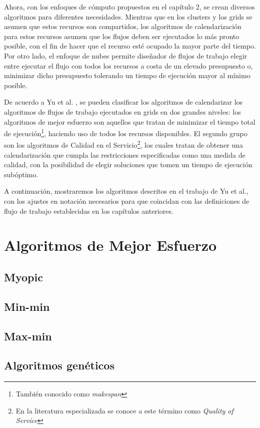 \documentclass[letterpaper, 12pt]{report}
\begin{document}
Ahora, con los enfoques de cómputo propuestos en el capítulo 2, se crean diversos algoritmos para diferentes necesidades. Mientras que en los clusters y los grids se asumen que estos recursos son compartidos, los algoritmos de calendarización para estos recursos asumen que los flujos deben ser ejecutados lo más pronto posible, con el fin de hacer que el recurso esté ocupado la mayor parte del tiempo. Por otro lado, el enfoque de nubes permite diseñador de flujos de trabajo elegir entre ejecutar el flujo con todos los recursos a costa de un elevado presupuesto o, minimizar dicho presupuesto tolerando un tiempo de ejecución mayor al mínimo posible.

De acuerdo a Yu et al. \cite{yu2008workflow}, se pueden clasificar los algoritmos de calendarizar los algoritmos de flujos de trabajo ejecutados en grids en dos grandes niveles: los algoritmos de mejor esfuerzo son aquellos que tratan de minimizar el tiempo total de ejecución\footnote{También conocido como \emph{makespan}}, haciendo uso de todos los recursos disponibles. El segundo grupo son los algoritmos de Calidad en el Servicio\footnote{En la literatura especializada se conoce a este término como \emph{Quality of Service}}, los cuales tratan de obtener una calendarización que cumpla las restricciones especificadas como una medida de calidad, con la posibilidad de elegir soluciones que tomen un tiempo de ejecución subóptimo.

A continuación, mostraremos los algoritmos descritos en el trabajo de Yu et al., con los ajustes en notación necesarios para que coincidan con las definiciones de flujo de trabajo establecidas en los capítulos anteriores.

\section{Algoritmos de Mejor Esfuerzo}
\subsection{Myopic}
\subsection{Min-min}
\subsection{Max-min}
\subsection{Algoritmos genéticos}
\end{document}
